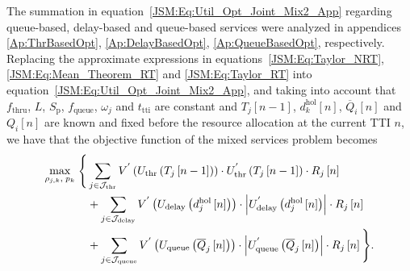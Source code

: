 \begin{apendicesenv}
The summation in equation~\eqref{JSM:Eq:Util_Opt_Joint_Mix2_App} regarding queue-based, delay-based and queue-based services were analyzed in appendices \ref{Ap:ThrBasedOpt}, \ref{Ap:DelayBasedOpt}, \ref{Ap:QueueBasedOpt}, respectively. Replacing the approximate expressions in equations~\eqref{JSM:Eq:Taylor_NRT}, \eqref{JSM:Eq:Mean_Theorem_RT} and \eqref{JSM:Eq:Taylor_RT} into equation~\eqref{JSM:Eq:Util_Opt_Joint_Mix2_App}, and taking into account that $f_{\mathrm{thru}}$, $L$, $S_\mathrm{p}$,  $f_{\mathrm{queue}}$, $\omega_j$ and $t_{\mathrm{tti}}$ are constant and $T_j\left[n-1\right]$, $d_{k}^{\mathrm{hol}}\left[n\right]$, $\overline{Q}_{i}\left[n\right]$ and $Q_{i}\left[n\right]$ are known and fixed before the resource allocation at the current \ac{TTI} $n$, we have that the objective function of the mixed services problem becomes
%
\begin{align}
\label{JSM:Eq:Util_Opt_Joint_Mix3}
\underset{\rho_{j,k},\;p_{k}}{\text{max}} \; \Bigg\{ & \sum_{j \in \mathcal{J}_{\mathrm{thr}}} V^{'}\left(U_{\mathrm{thr}}\left(T_{j}\left[n-1\right]\right)\right) \cdot U_{\mathrm{thr}}^{'}\left(T_{j}\left[n-1\right] \right) \cdot R_{j}\left[n\right] \notag\\ & + \sum_{j \in \mathcal{J}_{\mathrm{delay}}}
V^{'}\left(U_{\mathrm{delay}}\left(d_j^{\mathrm{hol}}\left[n\right]\right)\right) \cdot
\left|U_{\mathrm{delay}}^{'}\left( d_{j}^\mathrm{hol}\left[n\right]\right)\right| \cdot
R_j\left[n\right] \notag\\ & +  \sum_{j \in \mathcal{J}_{\mathrm{queue}}} V^{'}\left(U_{\mathrm{queue}}\left(\overline{Q}_{j}\left[n\right]\right)\right) \cdot \left|U_{\mathrm{queue}}^{'}\left( \overline{Q}_{j}\left[n\right]\right)\right| \cdot R_j\left[n\right]\Bigg\}.
\end{align}


\end{apendicesenv}

